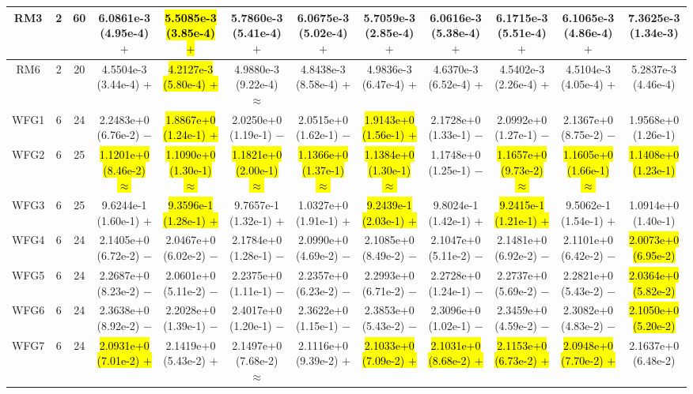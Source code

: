 \documentclass[journal]{IEEEtran}
\begin{document}
\begin{table*}[htbp]
\begin{tabular}{cccccccccccc}
\hline
\multirow{1}{*}{RM3}&2&60&6.0861e-3 (4.95e-4) $+$&\hl{5.5085e-3 (3.85e-4) $+$}&5.7860e-3 (5.41e-4) $+$&6.0675e-3 (5.02e-4) $+$&5.7059e-3 (2.85e-4) $+$&6.0616e-3 (5.38e-4) $+$&6.1715e-3 (5.51e-4) $+$&6.1065e-3 (4.86e-4) $+$&7.3625e-3 (1.34e-3)\\
\hline
\multirow{1}{*}{RM6}&2&20&4.5504e-3 (3.44e-4) $+$&\hl{4.2127e-3 (5.80e-4) $+$}&4.9880e-3 (9.22e-4) $\approx$&4.8438e-3 (8.58e-4) $+$&4.9836e-3 (6.47e-4) $+$&4.6370e-3 (6.52e-4) $+$&4.5402e-3 (2.26e-4) $+$&4.5104e-3 (4.05e-4) $+$&5.2837e-3 (4.46e-4)\\
\hline
\multirow{1}{*}{WFG1}&6&24&2.2483e+0 (6.76e-2) $-$&\hl{1.8867e+0 (1.24e-1) $+$}&2.0250e+0 (1.19e-1) $-$&2.0515e+0 (1.62e-1) $-$&\hl{1.9143e+0 (1.56e-1) $+$}&2.1728e+0 (1.33e-1) $-$&2.0992e+0 (1.27e-1) $-$&2.1367e+0 (8.75e-2) $-$&1.9568e+0 (1.26e-1)\\
\hline
\multirow{1}{*}{WFG2}&6&25&\hl{1.1201e+0 (8.46e-2) $\approx$}&\hl{1.1090e+0 (1.30e-1) $\approx$}&\hl{1.1821e+0 (2.00e-1) $\approx$}&\hl{1.1366e+0 (1.37e-1) $\approx$}&\hl{1.1384e+0 (1.30e-1) $\approx$}&1.1748e+0 (1.25e-1) $-$&\hl{1.1657e+0 (9.73e-2) $\approx$}&\hl{1.1605e+0 (1.66e-1) $\approx$}&\hl{1.1408e+0 (1.23e-1)}\\
\hline
\multirow{1}{*}{WFG3}&6&25&9.6244e-1 (1.60e-1) $+$&\hl{9.3596e-1 (1.28e-1) $+$}&9.7657e-1 (1.32e-1) $+$&1.0327e+0 (1.91e-1) $+$&\hl{9.2439e-1 (2.03e-1) $+$}&9.8024e-1 (1.42e-1) $+$&\hl{9.2415e-1 (1.21e-1) $+$}&9.5062e-1 (1.54e-1) $+$&1.0914e+0 (1.40e-1)\\
\hline
\multirow{1}{*}{WFG4}&6&24&2.1405e+0 (6.72e-2) $-$&2.0467e+0 (6.02e-2) $-$&2.1784e+0 (1.28e-1) $-$&2.0990e+0 (4.69e-2) $-$&2.1085e+0 (8.49e-2) $-$&2.1047e+0 (5.11e-2) $-$&2.1481e+0 (6.92e-2) $-$&2.1101e+0 (6.42e-2) $-$&\hl{2.0073e+0 (6.95e-2)}\\
\hline
\multirow{1}{*}{WFG5}&6&24&2.2687e+0 (8.23e-2) $-$&2.0601e+0 (5.11e-2) $-$&2.2375e+0 (1.11e-1) $-$&2.2357e+0 (6.23e-2) $-$&2.2993e+0 (6.71e-2) $-$&2.2728e+0 (1.24e-1) $-$&2.2737e+0 (5.69e-2) $-$&2.2821e+0 (5.43e-2) $-$&\hl{2.0364e+0 (5.82e-2)}\\
\hline
\multirow{1}{*}{WFG6}&6&24&2.3638e+0 (8.92e-2) $-$&2.2028e+0 (1.39e-1) $-$&2.4017e+0 (1.20e-1) $-$&2.3622e+0 (1.15e-1) $-$&2.3853e+0 (5.43e-2) $-$&2.3096e+0 (1.02e-1) $-$&2.3459e+0 (4.59e-2) $-$&2.3082e+0 (4.83e-2) $-$&\hl{2.1050e+0 (5.20e-2)}\\
\hline
\multirow{1}{*}{WFG7}&6&24&\hl{2.0931e+0 (7.01e-2) $+$}&2.1419e+0 (5.43e-2) $+$&2.1497e+0 (7.68e-2) $\approx$&2.1116e+0 (9.39e-2) $+$&\hl{2.1033e+0 (7.09e-2) $+$}&\hl{2.1031e+0 (8.68e-2) $+$}&\hl{2.1153e+0 (6.73e-2) $+$}&\hl{2.0948e+0 (7.70e-2) $+$}&2.1637e+0 (6.48e-2)\\

\end{tabular}
\end{table*}
\end{document}

